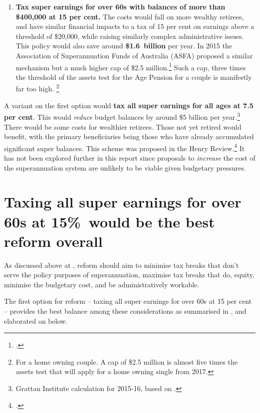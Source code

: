 \documentclass{grattanAlpha}
\begin{document}
\begin{enumerate}
%
\item \textbf{Tax super earnings for over 60s with balances of more than \$400,000 at 15 per cent.} The costs would fall on more wealthy retirees, and have similar financial impacts to a tax of 15 per cent on earnings above a threshold of \$20,000, while raising similarly complex administrative issues. This policy would also save around \textbf{\$1.6~billion} per year. In 2015 the Association of Superannuation Funds of Australia (ASFA) proposed a similar mechanism but a much higher cap of \$2.5 million.\footcite{Clare2015b}  Such a cap, three times the threshold of the assets test for the Age Pension for a couple is manifestly far too high.%
\footnote{For a home owning couple. A cap of \$2.5 million is almost five times the assets test that will apply for a home owning single from 2017.}  
\end{enumerate}

A variant on the first option would \textbf{tax all super earnings for all ages at 7.5 per cent}. This would \emph{reduce} budget balances by around \$5 billion per year.\footnote{Grattan Institute calculation for 2015-16, based on \textcite{Treasury2010SuperAdditionalMaterial}.}  There would be some costs for wealthier retirees. Those not yet retired would benefit, with the primary beneficiaries being those who have already accumulated significant super balances. This scheme was proposed in the Henry Review.\footcite[][36]{HenryTaxReview2010}  It has not been explored further in this report since proposals to \emph{increase} the cost of the superannuation system are unlikely to be viable given budgetary pressures.

\section{Taxing all super earnings for over 60s at 15\%\ would be the best reform overall}\label{sec:SUPER-6-4}
As discussed above at , reform should aim to minimise tax breaks that don’t serve the policy purposes of superannuation, maximise tax breaks that do, equity, minimise the budgetary cost, and be administratively workable.

The first option for reform – taxing all super earnings for over 60s at 15 per cent – provides the best balance among these considerations as summarised in , and elaborated on below.
\end{document}
